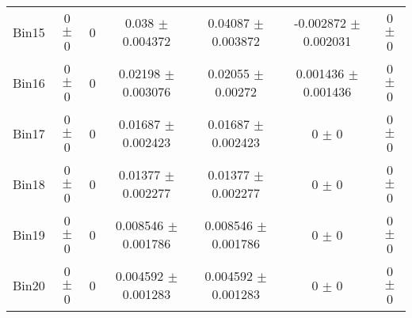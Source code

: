 \begin{tabular}{@{\extracolsep{4pt}}lcccccc@{}}
     Bin15 & 0 $\pm$ 0 & 0 & 0.038 $\pm$ 0.004372 & 0.04087 $\pm$ 0.003872 & -0.002872 $\pm$ 0.002031 & 0 $\pm$ 0 \\ 
     Bin16 & 0 $\pm$ 0 & 0 & 0.02198 $\pm$ 0.003076 & 0.02055 $\pm$ 0.00272 & 0.001436 $\pm$ 0.001436 & 0 $\pm$ 0 \\ 
     Bin17 & 0 $\pm$ 0 & 0 & 0.01687 $\pm$ 0.002423 & 0.01687 $\pm$ 0.002423 & 0 $\pm$ 0 & 0 $\pm$ 0 \\ 
     Bin18 & 0 $\pm$ 0 & 0 & 0.01377 $\pm$ 0.002277 & 0.01377 $\pm$ 0.002277 & 0 $\pm$ 0 & 0 $\pm$ 0 \\ 
     Bin19 & 0 $\pm$ 0 & 0 & 0.008546 $\pm$ 0.001786 & 0.008546 $\pm$ 0.001786 & 0 $\pm$ 0 & 0 $\pm$ 0 \\ 
     Bin20 & 0 $\pm$ 0 & 0 & 0.004592 $\pm$ 0.001283 & 0.004592 $\pm$ 0.001283 & 0 $\pm$ 0 & 0 $\pm$ 0 \\ 
\hline\hline
  \end{tabular}

